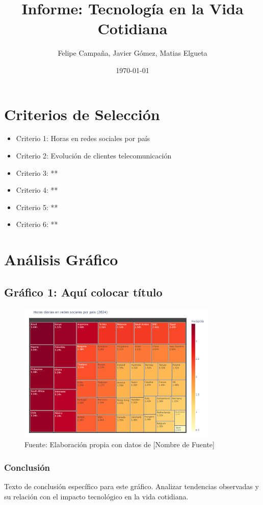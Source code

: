 \documentclass[12pt, a4paper]{article}
\title{Informe: Tecnología en la Vida Cotidiana}
\author{Felipe Campaña, Javier Gómez, Matias Elgueta}
\date{\today\\[2cm]
}
\begin{document}
\maketitle

\section*{Criterios de Selección}
\begin{itemize}
    \item Criterio 1: Horas en redes sociales por país
    \item Criterio 2: Evolución de clientes telecomunicación
    \item Criterio 3: **
    \item Criterio 4: **
    \item Criterio 5: **
    \item Criterio 6: **
\end{itemize}

\section*{Análisis Gráfico}

\subsection*{Gráfico 1: Aquí colocar título}
\begin{figure}[H]
    \centering
    \includegraphics[width=0.85\textwidth]{images/graph1_JG.png}
    \caption{Fuente: Elaboración propia con datos de [Nombre de Fuente]}
\end{figure}

\subsubsection*{Conclusión}
Texto de conclusión específico para este gráfico. Analizar tendencias observadas y su relación con el impacto tecnológico en la vida cotidiana.
\end{document}
